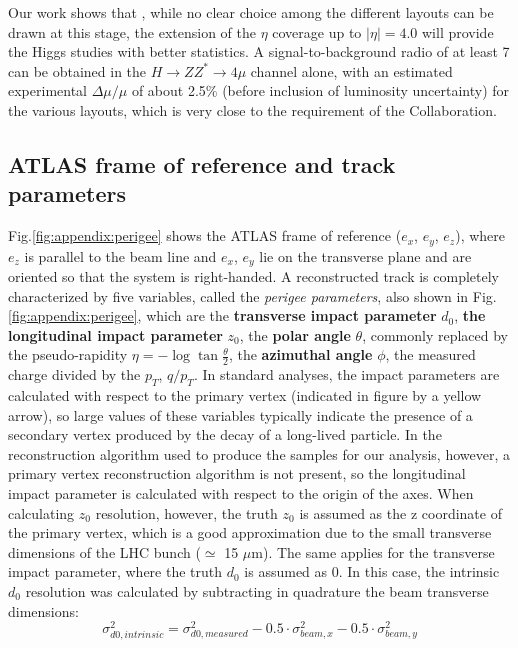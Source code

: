 \documentclass[a4paper,twoside,12pt]{book}
\begin{document}
Our work shows that , while no clear choice among the different layouts can be drawn at this stage, the extension of the $\eta$ coverage up to $|\eta| = 4.0$ will provide the Higgs studies with better statistics. A signal-to-background radio of at least 7 can be obtained in the $H \rightarrow ZZ^{*} \rightarrow 4\mu$ channel alone, with an estimated experimental $\Delta\mu/\mu$ of about 2.5\%  (before inclusion of luminosity uncertainty) for the various layouts, which is very close to the requirement of the Collaboration.

\clearpage

\begin{appendices}
\chapter{ATLAS frame of reference and track parameters} \label{appendix:perigee}
Fig.\ref{fig:appendix:perigee} shows the ATLAS frame of reference ($e_{x}$, $e_{y}$, $e_{z}$), where $e_{z}$ is parallel to the beam line and $e_{x}$, $e_{y}$ lie on the
transverse plane and are oriented so that the system is right-handed. A reconstructed track is completely characterized by five variables, called the \textit{perigee parameters}, also shown in
Fig.\ref{fig:appendix:perigee}, which are the \textbf{transverse impact parameter} $d_{0}$, \textbf{the longitudinal impact parameter} $z_{0}$, the \textbf{polar angle} $\theta$, commonly replaced by the 
pseudo-rapidity $\eta = -\log{\tan{\frac{\theta}{2}}}$, the \textbf{azimuthal angle} $\phi$, the measured charge divided by the $p_{T}$, {\boldmath$q/p_{T}$}. In standard analyses, the impact parameters are calculated with respect to the primary vertex (indicated in figure by a yellow arrow), so large values of these variables typically indicate the presence of a secondary 
vertex produced by the decay of a long-lived particle. In the reconstruction algorithm used to produce the samples for our analysis, however, a primary vertex reconstruction algorithm is not present, so the longitudinal impact parameter is calculated with 
respect to the origin of the axes. When calculating $z_{0}$ resolution, however, the truth $z_{0}$ is assumed as the z coordinate of the primary vertex, which is a
good approximation due to the small transverse dimensions of the LHC bunch ($\simeq$ 15 $\mu$m). The same applies for the transverse impact parameter, where the 
truth $d_{0}$ is assumed as 0. In this case, the intrinsic $d_{0}$ resolution was calculated by subtracting in quadrature the beam transverse dimensions:
\begin{equation*}
\text{$\sigma_{d0, intrinsic}^{2} = \sigma_{d0, measured}^{2} - 0.5 \cdot \sigma_{beam, x}^{2} - 0.5 \cdot \sigma_{beam, y}^{2}$}
\end{equation*}


\end{appendices}
\end{document}
